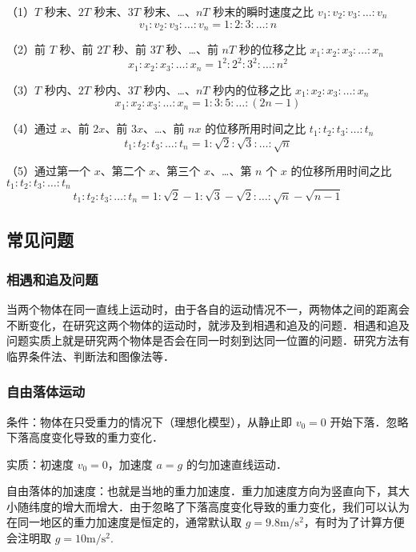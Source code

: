（1）$T$ 秒末、$2T$ 秒末、$3T$ 秒末、…、$nT$ 秒末的瞬时速度之比 $v_1:v_2:v_3:\dots:v_n$
\begin{equation}
v_1:v_2:v_3:\dots:v_n=1:2:3:\dots:n
\end{equation}

（2）前 $T$ 秒、前 $2T$ 秒、前 $3T$ 秒、…、前 $nT$ 秒的位移之比 $x_1:x_2:x_3:\dots:x_n$
\begin{equation}
x_1:x_2:x_3:\dots:x_n=1^2:2^2:3^2:\dots:n^2
\end{equation}

（3）$T$ 秒内、$2T$ 秒内、$3T$ 秒内、…、$nT$ 秒内的位移之比 $x_1:x_2:x_3:\dots:x_n$
\begin{equation}
x_1:x_2:x_3:\dots:x_n=1:3:5:\dots:(2n-1)
\end{equation}

（4）通过 $x$、前 $2x$、前 $3x$、…、前 $nx$ 的位移所用时间之比 $t_1:t_2:t_3:\dots:t_n$
\begin{equation}
t_1:t_2:t_3:\dots:t_n=1:\sqrt{2}:\sqrt{3}:\dots:\sqrt{n}
\end{equation}

（5）通过第一个 $x$、第二个 $x$、第三个 $x$、…、第 $n$ 个 $x$ 的位移所用时间之比 $t_1:t_2:t_3:\dots:t_n$
\begin{equation}
t_1:t_2:t_3:\dots:t_n=1:\sqrt{2}-1:\sqrt{3}-\sqrt{2}:\dots:\sqrt{n}-\sqrt{n-1}
\end{equation}

\subsection{常见问题}
\subsubsection{相遇和追及问题}
当两个物体在同一直线上运动时，由于各自的运动情况不一，两物体之间的距离会不断变化，在研究这两个物体的运动时，就涉及到相遇和追及的问题．相遇和追及问题实质上就是研究两个物体是否会在同一时刻到达同一位置的问题．研究方法有临界条件法、判断法和图像法等．

\subsubsection{自由落体运动}
条件：物体在只受重力的情况下（理想化模型），从静止即 $v_0=0$ 开始下落．忽略下落高度变化导致的重力变化．

实质：初速度 $v_0=0$，加速度 $a=g$ 的匀加速直线运动．

自由落体的加速度：也就是当地的重力加速度．重力加速度方向为竖直向下，其大小随纬度的增大而增大．由于忽略了下落高度变化导致的重力变化，我们可以认为在同一地区的重力加速度是恒定的，通常默认取 $g=9.8\mathrm{m/s^2}$，有时为了计算方便会注明取 $g=10\mathrm{m/s^2}$.


